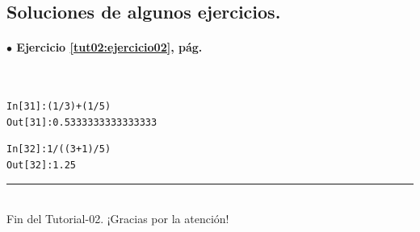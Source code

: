 \documentclass[10pt,a4paper]{article}\usepackage[]{graphicx}\usepackage[]{color}
\makeatletter
\newcommand{\hlnum}[1]{\textcolor[rgb]{0.686,0.059,0.569}{#1}}%
\newcommand{\hlopt}[1]{\textcolor[rgb]{0,0,0}{#1}}%
\newcommand{\hlstd}[1]{\textcolor[rgb]{0.345,0.345,0.345}{#1}}%
\newenvironment{kframe}{%
 \def\at@end@of@kframe{}%
 \ifinner\ifhmode%
  \def\at@end@of@kframe{\end{minipage}}%
  \begin{minipage}{\columnwidth}%
 \fi\fi%
 \def\FrameCommand##1{\hskip\@totalleftmargin \hskip-\fboxsep
 \colorbox{shadecolor}{##1}\hskip-\fboxsep
     \hskip-\linewidth \hskip-\@totalleftmargin \hskip\columnwidth}%
 \MakeFramed {\advance\hsize-\width
   \@totalleftmargin\z@ \linewidth\hsize
   \@setminipage}}%
 {\par\unskip\endMakeFramed%
 \at@end@of@kframe}
\newenvironment{knitrout}{}{} %
\makeatother
\begin{document}
\subsection*{Soluciones de algunos ejercicios.}

\paragraph{\bf $\bullet$ Ejercicio \ref{tut02:ejercicio02}, pág. \pageref{tut02:ejercicio02}}
\label{tut02:ejercicio02:sol}\quad\\

\begin{knitrout}
\color{fgcolor}\begin{kframe}
\begin{alltt}
\hlstd{In [}\hlnum{31}\hlstd{]}\hlopt{:} \hlstd{(}\hlnum{1}\hlopt{/}\hlnum{3}\hlstd{)}\hlopt{+}\hlstd{(}\hlnum{1}\hlopt{/}\hlnum{5}\hlstd{)}
\hlstd{Out[}\hlnum{31}\hlstd{]}\hlopt{:} \hlnum{0.5333333333333333}

\hlstd{In [}\hlnum{32}\hlstd{]}\hlopt{:} \hlnum{1} \hlopt{/}\hlstd{( (}\hlnum{3}\hlopt{+}\hlnum{1}\hlstd{)}\hlopt{/}\hlnum{5} \hlstd{)}
\hlstd{Out[}\hlnum{32}\hlstd{]}\hlopt{:} \hlnum{1.25}
\end{alltt}
\end{kframe}
\end{knitrout}



\vspace{2cm} \hrule
\quad\\
Fin del Tutorial-02. ¡Gracias por la atención!
\end{document}
